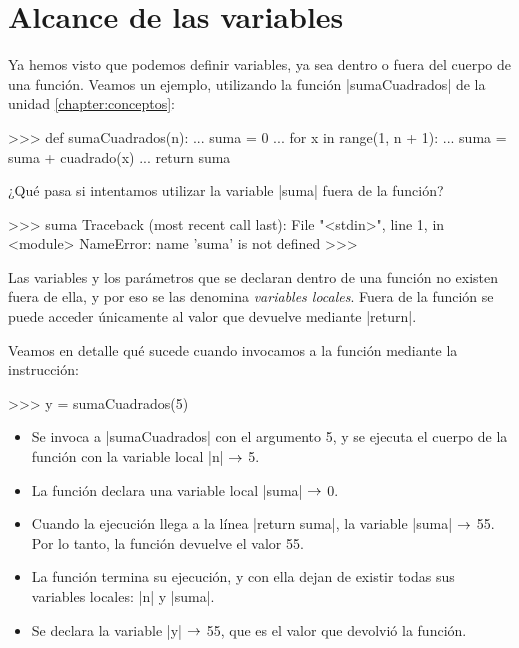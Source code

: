 \section{Alcance de las variables}

Ya hemos visto que podemos definir variables, ya sea dentro o fuera del cuerpo
de una función. Veamos un ejemplo, utilizando la función |sumaCuadrados| de la
unidad \ref{chapter:conceptos}:

\begin{codigo-python-sn}
>>> def sumaCuadrados(n):
...     suma = 0
...     for x in range(1, n + 1):
...         suma = suma + cuadrado(x)
...     return suma
\end{codigo-python-sn}

¿Qué pasa si intentamos utilizar la variable |suma| fuera de la función?

\begin{codigo-python-sn}
>>> suma
Traceback (most recent call last):
  File "<stdin>", line 1, in <module>
NameError: name 'suma' is not defined
>>>
\end{codigo-python-sn}

\begin{observacion}
Las variables y los parámetros que se declaran dentro de una función no existen
fuera de ella, y por eso se las denomina {\it variables locales}. Fuera de la
función se puede acceder únicamente al valor que devuelve mediante |return|.
\end{observacion}

Veamos en detalle qué sucede cuando invocamos a la función mediante la
instrucción:

\begin{codigo-python-sn}
>>> y = sumaCuadrados(5)
\end{codigo-python-sn}

\begin{itemize}
\item Se invoca a |sumaCuadrados| con el argumento 5, y se ejecuta
    el cuerpo de la función con la variable local |n| $\rightarrow$ 5.
\item La función declara una variable local |suma| $\rightarrow$ 0.
\item Cuando la ejecución llega a la línea |return suma|, la variable |suma|
    $\rightarrow$ 55. Por lo tanto, la función devuelve el valor 55.
\item La función termina su ejecución, y con ella dejan de existir todas sus
    variables locales: |n| y |suma|.
\item Se declara la variable |y| $\rightarrow$ 55, que es el valor que devolvió la
    función.
\end{itemize}

